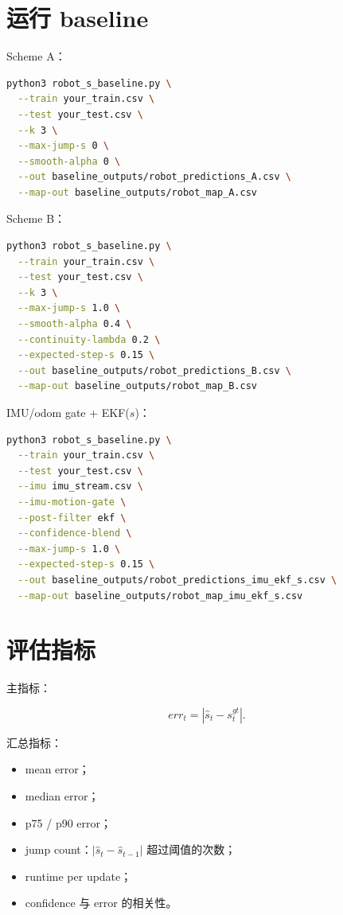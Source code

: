 \documentclass[11pt,a4paper,openany]{report}
\begin{document}
\section{运行 baseline}

Scheme A：

\begin{lstlisting}[language=bash]
python3 robot_s_baseline.py \
  --train your_train.csv \
  --test your_test.csv \
  --k 3 \
  --max-jump-s 0 \
  --smooth-alpha 0 \
  --out baseline_outputs/robot_predictions_A.csv \
  --map-out baseline_outputs/robot_map_A.csv
\end{lstlisting}

Scheme B：

\begin{lstlisting}[language=bash]
python3 robot_s_baseline.py \
  --train your_train.csv \
  --test your_test.csv \
  --k 3 \
  --max-jump-s 1.0 \
  --smooth-alpha 0.4 \
  --continuity-lambda 0.2 \
  --expected-step-s 0.15 \
  --out baseline_outputs/robot_predictions_B.csv \
  --map-out baseline_outputs/robot_map_B.csv
\end{lstlisting}

IMU/odom gate + EKF(\(s\))：

\begin{lstlisting}[language=bash]
python3 robot_s_baseline.py \
  --train your_train.csv \
  --test your_test.csv \
  --imu imu_stream.csv \
  --imu-motion-gate \
  --post-filter ekf \
  --confidence-blend \
  --max-jump-s 1.0 \
  --expected-step-s 0.15 \
  --out baseline_outputs/robot_predictions_imu_ekf_s.csv \
  --map-out baseline_outputs/robot_map_imu_ekf_s.csv
\end{lstlisting}

\section{评估指标}

主指标：

\[
  err_t = |\hat{s}_t - s_t^{gt}|.
\]

汇总指标：

\begin{itemize}
  \item mean error；
  \item median error；
  \item p75 / p90 error；
  \item jump count：\(|\hat{s}_t-\hat{s}_{t-1}|\) 超过阈值的次数；
  \item runtime per update；
  \item confidence 与 error 的相关性。
\end{itemize}
\end{document}
